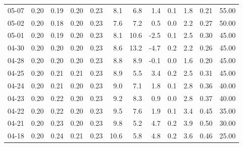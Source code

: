\begin{threeparttable}
{\begin{tabular}{lrrrrrrrrrrr}
  05-07 &          0.20 &          0.19 &          0.20 &        0.23 &                 8.1 &                 6.8 &        1.4 &                 0.1 &              1.8 &            0.21 &                  55.00 \\
  05-02 &          0.20 &          0.18 &          0.20 &        0.23 &                 7.6 &                 7.2 &        0.5 &                 0.0 &              2.2 &            0.27 &                  50.00 \\
  05-01 &          0.20 &          0.19 &          0.20 &        0.23 &                 8.1 &                10.6 &       -2.5 &                 0.1 &              2.5 &            0.30 &                  45.00 \\
  04-30 &          0.20 &          0.20 &          0.20 &        0.23 &                 8.6 &                13.2 &       -4.7 &                 0.2 &              2.2 &            0.26 &                  45.00 \\
  04-28 &          0.20 &          0.20 &          0.20 &        0.23 &                 8.8 &                 8.9 &       -0.1 &                 0.0 &              1.6 &            0.20 &                  45.00 \\
  04-25 &          0.20 &          0.21 &          0.21 &        0.23 &                 8.9 &                 5.5 &        3.4 &                 0.2 &              2.5 &            0.31 &                  45.00 \\
  04-24 &          0.20 &          0.21 &          0.20 &        0.23 &                 9.0 &                 7.1 &        1.8 &                 0.1 &              2.8 &            0.36 &                  40.00 \\
  04-23 &          0.20 &          0.22 &          0.20 &        0.23 &                 9.2 &                 8.3 &        0.9 &                 0.0 &              2.8 &            0.37 &                  40.00 \\
  04-22 &          0.20 &          0.22 &          0.20 &        0.23 &                 9.5 &                 7.6 &        1.9 &                 0.1 &              3.4 &            0.45 &                  35.00 \\
  04-21 &          0.20 &          0.23 &          0.20 &        0.23 &                 9.8 &                 5.2 &        4.7 &                 0.2 &              3.9 &            0.50 &                  30.00 \\
  04-18 &          0.20 &          0.24 &          0.21 &        0.23 &                10.6 &                 5.8 &        4.8 &                 0.2 &              3.6 &            0.46 &                  25.00 \\

\end{tabular}}
\end{threeparttable}
